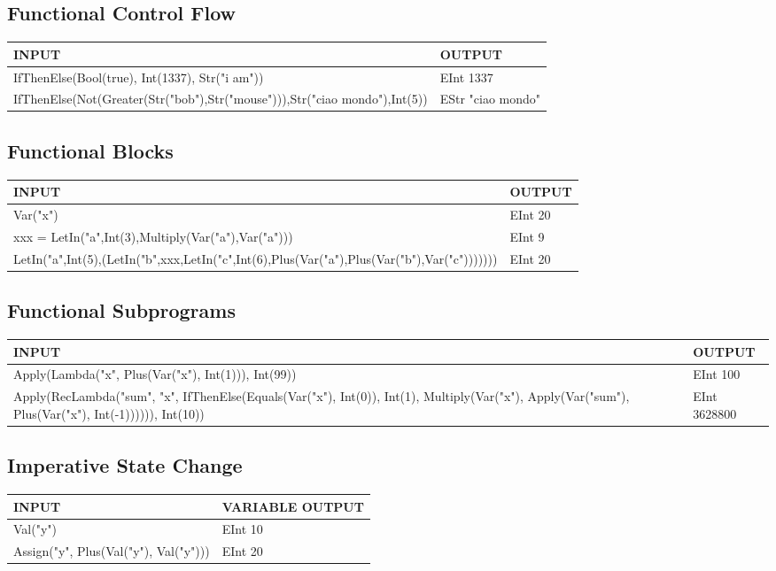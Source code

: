\documentclass[11pt]{article}
\begin{document}
\subsection{Functional Control Flow}
\label{sec:org26d1aa4}
\begin{center}
\begin{tabularx}{\textwidth}{Xl}
INPUT & OUTPUT\\
\hline
IfThenElse(Bool(true), Int(1337), Str("i am")) & EInt 1337\\
IfThenElse(Not(Greater(Str("bob"),Str("mouse"))),Str("ciao mondo"),Int(5)) & EStr "ciao mondo"\\
\end{tabularx}
\end{center}
\subsection{Functional Blocks}
\label{sec:org5f3fb1c}
\begin{center}
\begin{tabularx}{\textwidth}{Xl}
INPUT & OUTPUT\\
\hline
Var("x") & EInt 20\\
xxx = LetIn("a",Int(3),Multiply(Var("a"),Var("a"))) & EInt 9\\
LetIn("a",Int(5),(LetIn("b",xxx,LetIn("c",Int(6),Plus(Var("a"),Plus(Var("b"),Var("c"))))))) & EInt 20\\
\end{tabularx}
\end{center}
\subsection{Functional Subprograms}
\label{sec:org65ab544}
\begin{center}
\begin{tabularx}{\textwidth}{Xl}
INPUT & OUTPUT\\
\hline
Apply(Lambda("x", Plus(Var("x"), Int(1))), Int(99)) & EInt 100\\
Apply(RecLambda("sum", "x", IfThenElse(Equals(Var("x"), Int(0)), Int(1), Multiply(Var("x"), Apply(Var("sum"), Plus(Var("x"), Int(-1)))))), Int(10)) & EInt 3628800\\
\end{tabularx}
\end{center}
\subsection{Imperative State Change}
\label{sec:orgbb453ba}
\begin{center}
\begin{tabularx}{\textwidth}{ll}
INPUT & VARIABLE OUTPUT\\
\hline
Val("y") & EInt 10\\
Assign("y", Plus(Val("y"), Val("y"))) & EInt 20\\
\end{tabularx}
\end{center}
\end{document}
